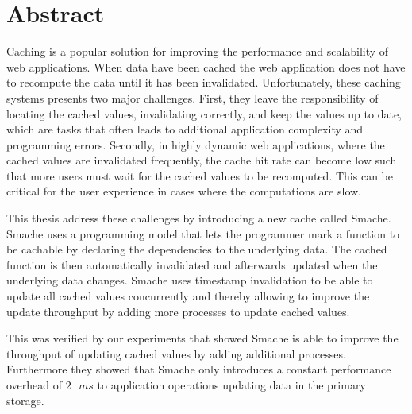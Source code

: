 \chapter{Abstract}

Caching is a popular solution for improving the performance and scalability of web applications. When data have been cached the web application does not have to recompute the data until it has been invalidated. Unfortunately, these caching systems presents two major challenges. First, they leave the responsibility of locating the cached values, invalidating correctly, and keep the values up to date, which are tasks that often leads to additional application complexity and programming errors. Secondly, in highly dynamic web applications, where the cached values are invalidated frequently, the cache hit rate can become low such that more users must wait for the cached values to be recomputed. This can be critical for the user experience in cases where the computations are slow.

This thesis address these challenges by introducing a new cache called Smache. Smache uses a programming model that lets the programmer mark a function to be cachable by declaring the dependencies to the underlying data. The cached function is then automatically invalidated and afterwards updated when the underlying data changes. Smache uses timestamp invalidation to be able to update all cached values concurrently and thereby allowing to improve the update throughput by adding more processes to update cached values.

This was verified by our experiments that showed Smache is able to improve the throughput of updating cached values by adding additional processes. Furthermore they showed that Smache only introduces a constant performance overhead of $2\text{ }ms$ to application operations updating data in the primary storage.

